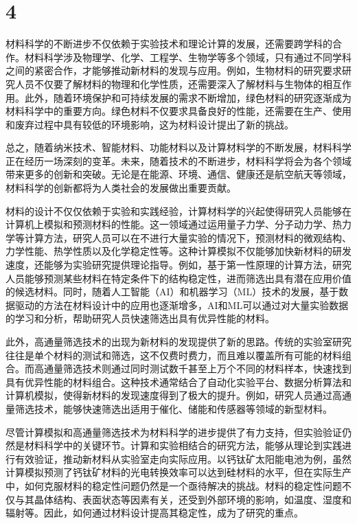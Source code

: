\section{4}
材料科学的不断进步不仅依赖于实验技术和理论计算的发展，还需要跨学科的合作。材料科学涉及物理学、化学、工程学、生物学等多个领域，只有通过不同学科之间的紧密合作，才能够推动新材料的发现与应用。例如，生物材料的研究要求研究人员不仅要了解材料的物理和化学性质，还需要深入了解材料与生物体的相互作用。此外，随着环境保护和可持续发展的需求不断增加，绿色材料的研究逐渐成为材料科学中的重要方向。绿色材料不仅要求具备良好的性能，还需要在生产、使用和废弃过程中具有较低的环境影响，这为材料设计提出了新的挑战。\par
总之，随着纳米技术、智能材料、功能材料以及计算材料学的不断发展，材料科学正在经历一场深刻的变革。未来，随着技术的不断进步，材料科学将会为各个领域带来更多的创新和突破。无论是在能源、环境、通信、健康还是航空航天等领域，材料科学的创新都将为人类社会的发展做出重要贡献。\par
材料的设计不仅仅依赖于实验和实践经验，计算材料学的兴起使得研究人员能够在计算机上模拟和预测材料的性能。这一领域通过运用量子力学、分子动力学、热力学等计算方法，研究人员可以在不进行大量实验的情况下，预测材料的微观结构、力学性能、热学性质以及化学稳定性等。这种计算模拟不仅能够加快新材料的研发速度，还能够为实验研究提供理论指导。例如，基于第一性原理的计算方法，研究人员能够预测某些材料在特定条件下的结构稳定性，进而筛选出具有潜在应用价值的候选材料。同时，随着人工智能（AI）和机器学习（ML）技术的发展，基于数据驱动的方法在材料设计中的应用也逐渐增多，AI和ML可以通过对大量实验数据的学习和分析，帮助研究人员快速筛选出具有优异性能的材料。\par
此外，高通量筛选技术的出现为新材料的发现提供了新的思路。传统的实验室研究往往是单个材料的测试和筛选，这不仅费时费力，而且难以覆盖所有可能的材料组合。而高通量筛选技术则通过同时测试数千甚至上万个不同的材料样本，快速找到具有优异性能的材料组合。这种技术通常结合了自动化实验平台、数据分析算法和计算机模拟，使得新材料的发现速度得到了极大的提升。例如，研究人员通过高通量筛选技术，能够快速筛选出适用于催化、储能和传感器等领域的新型材料。\par
尽管计算模拟和高通量筛选技术为材料科学的进步提供了有力支持，但实验验证仍然是材料科学中的关键环节。计算和实验相结合的研究方法，能够从理论到实践进行有效验证，推动新材料从实验室走向实际应用。以钙钛矿太阳能电池为例，虽然计算模拟预测了钙钛矿材料的光电转换效率可以达到硅材料的水平，但在实际生产中，如何克服材料的稳定性问题仍然是一个亟待解决的挑战。材料的稳定性问题不仅与其晶体结构、表面状态等因素有关，还受到外部环境的影响，如温度、湿度和辐射等。因此，如何通过材料设计提高其稳定性，成为了研究的重点。\par

